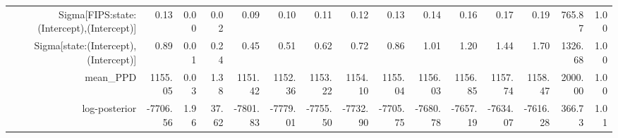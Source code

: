 \begin{table}[ht]
\begin{tabular}{rrrrrrrrrrrrrrr}
  Sigma[FIPS:state:(Intercept),(Intercept)] & 0.13 & 0.00 & 0.02 & 0.09 & 0.10 & 0.11 & 0.12 & 0.13 & 0.14 & 0.16 & 0.17 & 0.19 & 765.87 & 1.00 \\ 
  Sigma[state:(Intercept),(Intercept)] & 0.89 & 0.01 & 0.24 & 0.45 & 0.51 & 0.62 & 0.72 & 0.86 & 1.01 & 1.20 & 1.44 & 1.70 & 1326.68 & 1.00 \\ 
  mean\_PPD & 1155.05 & 0.03 & 1.38 & 1151.42 & 1152.36 & 1153.22 & 1154.10 & 1155.04 & 1156.03 & 1156.85 & 1157.74 & 1158.47 & 2000.00 & 1.00 \\ 
  log-posterior & -7706.56 & 1.96 & 37.62 & -7801.83 & -7779.01 & -7755.50 & -7732.90 & -7705.75 & -7680.78 & -7657.19 & -7634.07 & -7616.28 & 366.73 & 1.01 \\ 
   \hline
\end{tabular}
\end{table}
